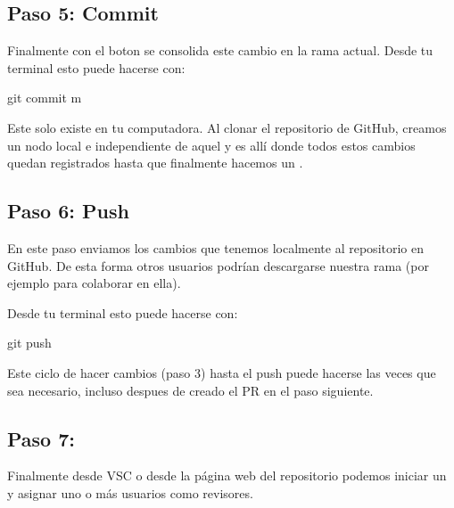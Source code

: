 \documentclass[a5paper,9pt,spanish]{sphinxmanual}
\begin{document}
\noindent{}


\subsection{Paso 5: Commit}
\label{\detokenize{mi-primer-pr:paso-5-commit}}
\sphinxAtStartPar
Finalmente con el boton  se consolida este cambio en la rama actual.
Desde tu terminal esto puede hacerse con:

\begin{sphinxVerbatim}[commandchars=\\\{\}]
git commit \PYGZhy{}m 
\end{sphinxVerbatim}

\sphinxAtStartPar
{} Este  solo existe en tu computadora. Al clonar el
repositorio de GitHub, creamos un nodo local e independiente de aquel y es
allí donde todos estos cambios quedan registrados hasta que finalmente hacemos
un .


\subsection{Paso 6: Push}
\label{\detokenize{mi-primer-pr:paso-6-push}}
\sphinxAtStartPar
En este paso enviamos los cambios que tenemos localmente al repositorio en GitHub.
De esta forma otros usuarios podrían descargarse nuestra rama (por ejemplo para
colaborar en ella).

\noindent{}

\sphinxAtStartPar
Desde tu terminal esto puede hacerse con:

\begin{sphinxVerbatim}[commandchars=\\\{\}]
git push
\end{sphinxVerbatim}

\sphinxAtStartPar
Este ciclo de hacer cambios (paso 3) hasta el push puede hacerse las veces que
sea necesario, incluso despues de creado el PR en el paso siguiente.


\subsection{Paso 7: }
\label{\detokenize{mi-primer-pr:paso-7-pull-requets}}
\sphinxAtStartPar
Finalmente desde VSC o desde la página web del repositorio podemos
iniciar un  y asignar uno o más usuarios como revisores.
\end{document}
